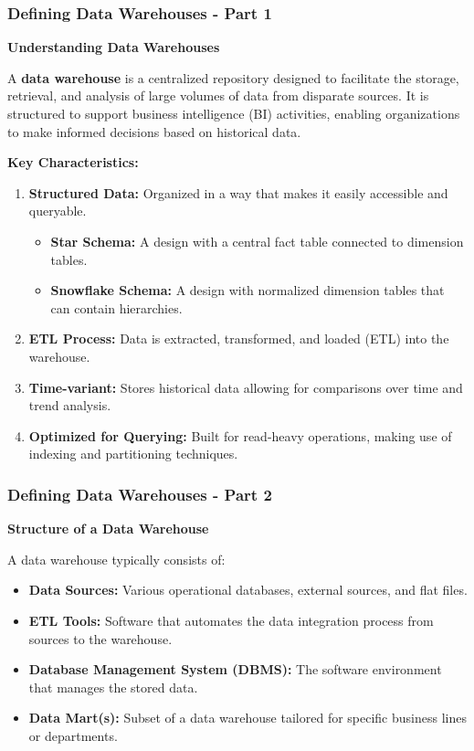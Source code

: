 \documentclass[aspectratio=169]{beamer}
\begin{document}
\begin{frame}[fragile]
    \frametitle{Defining Data Warehouses - Part 1}
    
    \textbf{Understanding Data Warehouses}

    A \textbf{data warehouse} is a centralized repository designed to facilitate the storage, retrieval, and analysis of large volumes of data from disparate sources. It is structured to support business intelligence (BI) activities, enabling organizations to make informed decisions based on historical data.

    \textbf{Key Characteristics:}
    \begin{enumerate}
        \item \textbf{Structured Data:} Organized in a way that makes it easily accessible and queryable.
        \begin{itemize}
            \item \textbf{Star Schema:} A design with a central fact table connected to dimension tables.
            \item \textbf{Snowflake Schema:} A design with normalized dimension tables that can contain hierarchies.
        \end{itemize}
        
        \item \textbf{ETL Process:} Data is extracted, transformed, and loaded (ETL) into the warehouse.
        
        \item \textbf{Time-variant:} Stores historical data allowing for comparisons over time and trend analysis.
        
        \item \textbf{Optimized for Querying:} Built for read-heavy operations, making use of indexing and partitioning techniques.
    \end{enumerate}
\end{frame}

\begin{frame}[fragile]
    \frametitle{Defining Data Warehouses - Part 2}
    
    \textbf{Structure of a Data Warehouse}

    A data warehouse typically consists of:
    \begin{itemize}
        \item \textbf{Data Sources:} Various operational databases, external sources, and flat files.
        \item \textbf{ETL Tools:} Software that automates the data integration process from sources to the warehouse.
        \item \textbf{Database Management System (DBMS):} The software environment that manages the stored data.
        \item \textbf{Data Mart(s):} Subset of a data warehouse tailored for specific business lines or departments.
    \end{itemize}
\end{frame}
\end{document}
